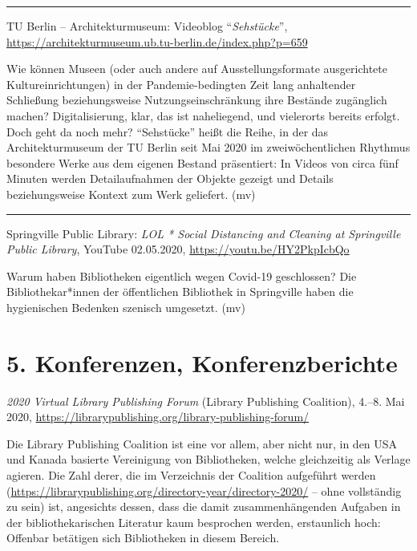 \documentclass[a4paper,
fontsize=11pt,
oneside,
numbers=noperiodatend,
parskip=half-,
bibliography=totoc,
final
]{scrartcl}
\begin{document}
\begin{center}\rule{0.5\linewidth}{0.5pt}\end{center}

TU Berlin -- Architekturmuseum: Videoblog \enquote{\emph{Sehstücke}},
\url{https://architekturmuseum.ub.tu-berlin.de/index.php?p=659}

Wie können Museen (oder auch andere auf Ausstellungsformate
ausgerichtete Kultureinrichtungen) in der Pandemie-bedingten Zeit lang
anhaltender Schließung beziehungsweise Nutzungseinschränkung ihre
Bestände zugänglich machen? Digitalisierung, klar, das ist naheliegend,
und vielerorts bereits erfolgt. Doch geht da noch mehr?
\enquote{Sehstücke} heißt die Reihe, in der das Architekturmuseum der TU
Berlin seit Mai 2020 im zweiwöchentlichen Rhythmus besondere Werke aus
dem eigenen Bestand präsentiert: In Videos von circa fünf Minuten werden
Detailaufnahmen der Objekte gezeigt und Details beziehungsweise Kontext
zum Werk geliefert. (mv)

\begin{center}\rule{0.5\linewidth}{0.5pt}\end{center}

Springville Public Library: \emph{LOL * Social Distancing and Cleaning
at Springville Public Library}, YouTube 02.05.2020,
\url{https://youtu.be/HY2PkpIcbQo}

Warum haben Bibliotheken eigentlich wegen Covid-19 geschlossen? Die
Bibliothekar*innen der öffentlichen Bibliothek in Springville haben die
hygienischen Bedenken szenisch umgesetzt. (mv)

\hypertarget{konferenzen-konferenzberichte}{%
\section{5. Konferenzen,
Konferenzberichte}\label{konferenzen-konferenzberichte}}

\emph{2020 Virtual Library Publishing Forum} (Library Publishing
Coalition), 4.--8. Mai 2020,
\url{https://librarypublishing.org/library-publishing-forum/}

Die Library Publishing Coalition ist eine vor allem, aber nicht nur, in
den USA und Kanada basierte Vereinigung von Bibliotheken, welche
gleichzeitig als Verlage agieren. Die Zahl derer, die im Verzeichnis der
Coalition aufgeführt werden
(\url{https://librarypublishing.org/directory-year/directory-2020/} --
ohne vollständig zu sein) ist, angesichts dessen, dass die damit
zusammenhängenden Aufgaben in der bibliothekarischen Literatur kaum
besprochen werden, erstaunlich hoch: Offenbar betätigen sich
Bibliotheken in diesem Bereich.
\end{document}
